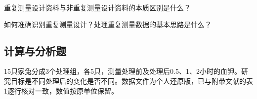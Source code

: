 \par\addvspace{6pt}\noindent\begin{minipage}{\linewidth}


重复测量设计资料与非重复测量设计资料的本质区别是什么？



\end{minipage}\par\vspace{4pt}

\par\addvspace{6pt}\noindent\begin{minipage}{\linewidth}


如何准确识别重复测量设计？处理重复测量数据的基本思路是什么？



\end{minipage}\par\vspace{4pt}

\subsection{计算与分析题}


15只家兔分成3个处理组，各5只，测量处理前及处理后0.5、1、2小时的血钾。研究目标是不同处理后的变化是否不同。数据文件为个人还原版，已与附带文献的表1逐行核对一致，数值按原单位保留。

